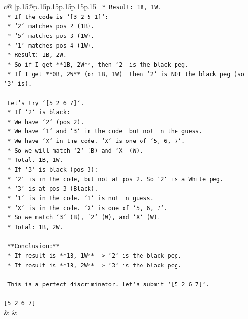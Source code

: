 \documentclass{article}
\begin{document}
{\begin{supertabular}{c@{$\;$}|p{.15\linewidth}@{}p{.15\linewidth}p{.15\linewidth}p{.15\linewidth}p{.15\linewidth}p{.15\linewidth}}
{{{\texttt{                *   Result: 1B, 1W.} \\
\texttt{            *   If the code is `{[}3 2 5 1{]}`:} \\
\texttt{                *   `2` matches pos 2 (1B).} \\
\texttt{                *   `5` matches pos 3 (1W).} \\
\texttt{                *   `1` matches pos 4 (1W).} \\
\texttt{                *   Result: 1B, 2W.} \\
\texttt{    *   So if I get **1B, 2W**, then `2` is the black peg.} \\
\texttt{    *   If I get **0B, 2W** (or 1B, 1W), then `2` is NOT the black peg (so `3` is).} \\
\\ 
\texttt{    Let's try `{[}5 2 6 7{]}`.} \\
\texttt{    *   If `2` is black:} \\
\texttt{        *   We have `2` (pos 2).} \\
\texttt{        *   We have `1` and `3` in the code, but not in the guess.} \\
\texttt{        *   We have `X` in the code. `X` is one of `5, 6, 7`.} \\
\texttt{        *   So we will match `2` (B) and `X` (W).} \\
\texttt{        *   Total: 1B, 1W.} \\
\texttt{    *   If `3` is black (pos 3):} \\
\texttt{        *   `2` is in the code, but not at pos 2. So `2` is a White peg.} \\
\texttt{        *   `3` is at pos 3 (Black).} \\
\texttt{        *   `1` is in the code. `1` is not in guess.} \\
\texttt{        *   `X` is in the code. `X` is one of `5, 6, 7`.} \\
\texttt{        *   So we match `3` (B), `2` (W), and `X` (W).} \\
\texttt{        *   Total: 1B, 2W.} \\
\\ 
\texttt{    **Conclusion:**} \\
\texttt{    *   If result is **1B, 1W** {-}> `2` is the black peg.} \\
\texttt{    *   If result is **1B, 2W** {-}> `3` is the black peg.} \\
\\ 
\texttt{    This is a perfect discriminator. Let's submit `{[}5 2 6 7{]}`.} \\
\\ 
\texttt{{[}5 2 6 7{]}} \\
            }
        }
    }
    & & \\ \\


\end{supertabular}}
\end{document}
